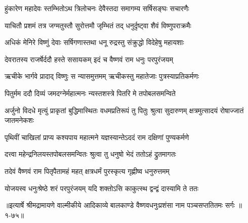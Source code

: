 \twolineshloka
{हुंकारेण महादेवः स्तम्भितोऽथ त्रिलोचनः}
{देवैस्तदा समागम्य सर्षिसङ्घः सचारणैः} %

\twolineshloka
{याचितौ प्रशमं तत्र जग्मतुस्तौ सुरोत्तमौ}
{जृम्भितं तद् धनुर्दृष्ट्वा शैवं विष्णुपराक्रमैः} %

\twolineshloka
{अधिकं मेनिरे विष्णुं देवाः सर्षिगणास्तथा}
{धनू रुद्रस्तु संक्रुद्धो विदेहेषु महायशाः} %

\twolineshloka
{देवरातस्य राजर्षेर्ददौ हस्ते ससायकम्}
{इदं च वैष्णवं राम धनुः परपुरंजयम्} %

\twolineshloka
{ऋचीके भार्गवे प्रादाद् विष्णुः स न्यासमुत्तमम्}
{ऋचीकस्तु महातेजाः पुत्रस्याप्रतिकर्मणः} %

\twolineshloka
{पितुर्मम ददौ दिव्यं जमदग्नेर्महात्मनः}
{न्यस्तशस्त्रे पितरि मे तपोबलसमन्विते} %

\threelineshloka
{अर्जुनो विदधे मृत्युं प्राकृतां बुद्धिमास्थितः}
{वधमप्रतिरूपं तु पितुः श्रुत्वा सुदारुणम्}
{क्षत्रमुत्सादयं रोषाज्जातं जातमनेकशः} %

\twolineshloka
{पृथिवीं चाखिलां प्राप्य कश्यपाय महात्मने}
{यज्ञस्यान्तेऽददं राम दक्षिणां पुण्यकर्मणे} %

\twolineshloka
{दत्त्वा महेन्द्रनिलयस्तपोबलसमन्वितः}
{श्रुत्वा तु धनुषो भेदं ततोऽहं द्रुतमागतः} %

\twolineshloka
{तदेवं वैष्णवं राम पितृपैतामहं महत्}
{क्षत्रधर्मं पुरस्कृत्य गृह्णीष्व धनुरुत्तमम्} %

\twolineshloka
{योजयस्व धनुःश्रेष्ठे शरं परपुरंजयम्}
{यदि शक्तोऽसि काकुत्स्थ द्वन्द्वं दास्यामि ते ततः} %


॥इत्यार्षे श्रीमद्रामायणे वाल्मीकीये आदिकाव्ये बालकाण्डे वैष्णवधनुःप्रशंसा नाम पञ्चसप्ततितमः सर्गः ॥१-७५॥
